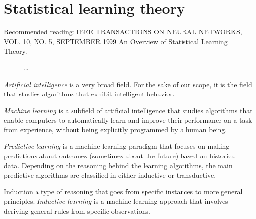 \chapter{Statistical learning theory}



Recommended reading: IEEE TRANSACTIONS ON NEURAL NETWORKS, VOL. 10, NO. 5, SEPTEMBER 1999
An Overview of Statistical Learning Theory.

\begin{figure}
  \centering
  \caption{
    \dots
  }
\end{figure}

\emph{Artificial intelligence} is a very broad field.  For the sake of our scope, it is
the field that studies algorithms that exhibit intelligent behavior.

\emph{Machine learning} is a subfield of artificial intelligence that studies algorithms
that enable computers to automatically learn and improve their performance on a task from
experience, without being explicitly programmed by a human being.

\emph{Predictive learning} is a machine learning paradigm that focuses on making
predictions about outcomes (sometimes about the future) based on historical data.
Depending on the reasoning behind the learning algorithms, the main predictive algorithms
are classified in either inductive or transductive.

Induction a type of reasoning that goes from specific instances to more general
principles. \emph{Inductive learning} is a machine learning approach that involves deriving
general rules from specific observations.

